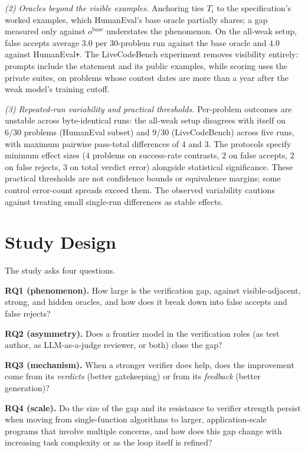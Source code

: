 \emph{(2) Oracles beyond the visible examples.} Anchoring ties $T_i$ to the
specification's worked examples, which HumanEval's base oracle partially shares; a gap
measured only against $o^{\mathrm{base}}$ understates the phenomenon. On the all-weak
setup, false accepts average $3.0$ per 30-problem run against the base oracle and
$4.0$ against HumanEval\texttt{+}.
The LiveCodeBench experiment removes visibility entirely: prompts include the statement and its
public examples, while scoring uses the private suites, on problems whose contest dates
are more than a year after the weak model's training cutoff.

\emph{(3) Repeated-run variability and practical thresholds.} Per-problem outcomes are unstable across
byte-identical runs: the all-weak setup disagrees with itself on $6/30$ problems (HumanEval
subset) and $9/30$ (LiveCodeBench) across five runs, with maximum pairwise pass-total
differences of $4$ and $3$.
The protocols specify minimum effect sizes ($4$ problems on
success-rate contrasts, $2$ on false accepts, $2$ on false rejects, $3$ on total verdict
error) alongside statistical significance. These practical thresholds are not confidence bounds
or equivalence margins; some control error-count spreads exceed them. The observed
variability cautions against treating small single-run differences as stable effects.

\section{Study Design}
\label{sec:design}

The study asks four questions.


\noindent\textbf{RQ1 (phenomenon).} How large is the verification gap, against visible-adjacent,
strong, and hidden oracles, and how does it break down into false accepts and false rejects?

\noindent\textbf{RQ2 (asymmetry).} Does a frontier model in the verification roles (as test author,
as LLM-as-a-judge reviewer, or both) close the gap?

\noindent\textbf{RQ3 (mechanism).} When a stronger verifier does help, does the improvement come
from its \emph{verdicts} (better gatekeeping) or from its \emph{feedback} (better generation)?

\noindent\textbf{RQ4 (scale).} Do the size of the gap and its resistance to verifier strength persist
when moving from single-function algorithms to larger, application-scale programs that involve
multiple concerns, and how does this gap change with increasing task complexity or as the loop
itself is refined?


